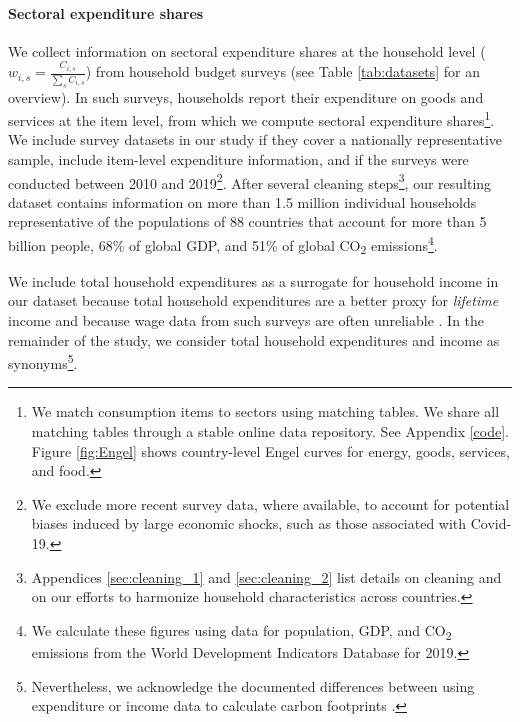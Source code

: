 \documentclass[12pt, a4paper]{article}
\begin{document}
\paragraph{Sectoral expenditure shares} We collect information on sectoral expenditure shares at the household level ($w_{i,s}=\frac{C_{i,s}}{\sum_{s}C_{i,s}}$) from household budget surveys (see Table \ref{tab:datasets} for an overview). In such surveys, households report their expenditure on goods and services at the item level, from which we compute sectoral expenditure shares\footnote{We match consumption items to sectors using matching tables. We share all matching tables through a stable online data repository. See Appendix \ref{code}. Figure \ref{fig:Engel} shows country-level Engel curves for energy, goods, services, and food.}. We include survey datasets in our study if they cover a nationally representative sample, include item-level expenditure information, and if the surveys were conducted between 2010 and 2019\footnote{We exclude more recent survey data, where available, to account for potential biases induced by large economic shocks, such as those associated with Covid-19.}. After several cleaning steps\footnote{Appendices \ref{sec:cleaning_1} and \ref{sec:cleaning_2} list details on cleaning and on our efforts to harmonize household characteristics across countries.}, our resulting dataset contains information on more than 1.5 million individual households representative of the populations of 88 countries that account for more than 5 billion people, 68\% of global GDP, and 51\% of global CO\textsubscript{2} emissions\footnote{We calculate these figures using data for population, GDP, and CO\textsubscript{2} emissions from the World Development Indicators Database \autocite{WorldBankGroup.2023} for 2019.}.

We include total household expenditures as a surrogate for household income in our dataset because total household expenditures are a better proxy for \textit{lifetime} income \autocite{Poterba.1989,Poterba.1991,Cronin.2019} and because wage data from such surveys are often unreliable \autocite{Blundell.1998}. In the remainder of the study, we consider total household expenditures and income as synonyms\footnote{Nevertheless, we acknowledge the documented differences between using expenditure or income data to calculate carbon footprints \autocite[see][]{Levay.2023}.}.
\end{document}
